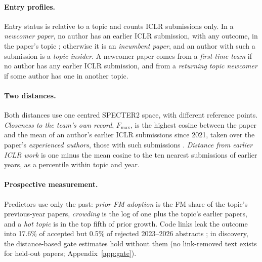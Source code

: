 \documentclass[11pt]{article}
\newcommand{\Fmax}{\ensuremath{F_{\max}}}
\begin{document}
\paragraph{Entry profiles.}
Entry status is relative to a topic and counts ICLR submissions only. In a \emph{newcomer paper}, no author has an
earlier ICLR submission, with any outcome, in the paper's topic \citep[a topic-relative definition, as
in][]{biliotti2024breaking}; otherwise it is an \emph{incumbent paper}, and an author with such a submission is a
\emph{topic insider}. A newcomer paper comes from a \emph{first-time team} if no author has any earlier ICLR
submission, and from a \emph{returning topic newcomer} if some author has one in another topic.

\paragraph{Two distances.}
Both distances use one centred SPECTER2 space, with different reference points. \emph{Closeness to the team's own record},
\Fmax{}, is the highest cosine between the paper and the mean of an author's earlier ICLR submissions since 2021,
taken over the paper's \emph{experienced authors}, those with such submissions \citep[following][]{bao2025persistence}. \emph{Distance from earlier
ICLR work} is one minus the mean cosine to the ten nearest submissions of earlier years, as a percentile within topic
and year.

\paragraph{Prospective measurement.}
Predictors use only the past: \emph{prior FM adoption} is the FM share of the topic's previous-year papers,
\emph{crowding} is the log of one plus the topic's earlier papers, and a \emph{hot topic} is in the top fifth of
prior growth. Code links leak the outcome into 17.6\% of accepted but 0.5\% of rejected 2023--2026 abstracts
\citep{kaufman2012leakage}; in discovery, the distance-based gate estimates hold without them (no link-removed text
exists for held-out papers; Appendix~\ref{app:gate}).
\end{document}
